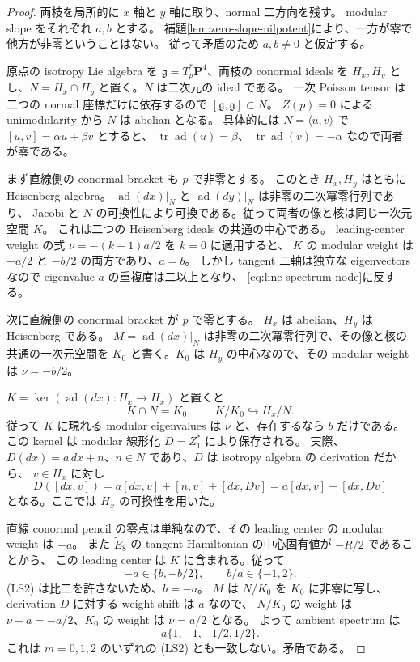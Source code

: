 \documentclass[11pt,a4paper]{ltjsarticle}
\newcommand{\PP}{\mathbf P}\renewcommand{\AA}{\mathbf A}
\theoremstyle{remark}\newtheorem{remark}[theorem]{注意}
\begin{document}
\begin{proof}
両枝を局所的に $x$ 軸と $y$ 軸に取り、normal 二方向を残す。
modular slope をそれぞれ $a,b$ とする。
補題\ref{lem:zero-slope-nilpotent}により、一方が零で他方が非零ということはない。
従って矛盾のため $a,b\ne0$ と仮定する。

原点の isotropy Lie algebra を $\mathfrak g=T_p^*\PP^4$、両枝の conormal ideals を
$H_x,H_y$ とし、$N=H_x\cap H_y$ と置く。$N$ は二次元の ideal である。
一次 Poisson tensor は二つの normal 座標だけに依存するので
$[\mathfrak g,\mathfrak g]\subset N$。
$Z(p)=0$ による unimodularity から $N$ は abelian となる。
具体的には $N=\langle u,v\rangle$ で $[u,v]=\alpha u+\beta v$ とすると、
$\operatorname{tr}\operatorname{ad}(u)=\beta$、
$\operatorname{tr}\operatorname{ad}(v)=-\alpha$ なので両者が零である。

まず直線側の conormal bracket も $p$ で非零とする。
このとき $H_x,H_y$ はともに Heisenberg algebra。
$\operatorname{ad}(dx)|_N$ と $\operatorname{ad}(dy)|_N$ は非零の二次冪零行列であり、
Jacobi と $N$ の可換性により可換である。従って両者の像と核は同じ一次元空間 $K$。
これは二つの Heisenberg ideals の共通の中心である。
leading-center weight の式 $\nu=-(k+1)a/2$ を $k=0$ に適用すると、
$K$ の modular weight は $-a/2$ と $-b/2$ の両方であり、$a=b$。
しかし tangent 二軸は独立な eigenvectors なので eigenvalue $a$ の重複度は二以上となり、
\eqref{eq:line-spectrum-node}に反する。

次に直線側の conormal bracket が $p$ で零とする。
$H_x$ は abelian、$H_y$ は Heisenberg である。
$M=\operatorname{ad}(dx)|_N$ は非零の二次冪零行列で、その像と核の共通の一次元空間を
$K_0$ と書く。$K_0$ は $H_y$ の中心なので、その modular weight は $\nu=-b/2$。

$K=\ker(\operatorname{ad}(dx):H_x\to H_x)$ と置くと
\[
 K\cap N=K_0,\qquad K/K_0\hookrightarrow H_x/N.
\]
従って $K$ に現れる modular eigenvalues は $\nu$ と、存在するなら $b$ だけである。
この kernel は modular 線形化 $D=Z_1^*$ により保存される。
実際、$D(dx)=a\,dx+n$、$n\in N$ であり、$D$ は isotropy algebra の derivation だから、
$v\in H_x$ に対し
\[
 D([dx,v])=a[dx,v]+[n,v]+[dx,Dv]
 =a[dx,v]+[dx,Dv]
\]
となる。ここでは $H_x$ の可換性を用いた。

直線 conormal pencil の零点は単純なので、その leading center の modular weight は $-a$。
また $\widetilde E_8$ の tangent Hamiltonian の中心固有値が $-R/2$ であることから、
この leading center は $K$ に含まれる。従って
\[
 -a\in\{b,-b/2\},\qquad b/a\in\{-1,2\}.
\]
(LS2) は比二を許さないため、$b=-a$。
$M$ は $N/K_0$ を $K_0$ に非零に写し、derivation $D$ に対する weight shift は $a$ なので、
$N/K_0$ の weight は $\nu-a=-a/2$、$K_0$ の weight は $\nu=a/2$ となる。
よって ambient spectrum は
\[
 a\{1,-1,-1/2,1/2\}.
\]
これは $m=0,1,2$ のいずれの (LS2) とも一致しない。矛盾である。
\end{proof}
\end{document}
